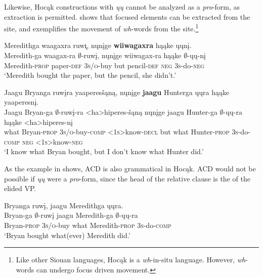 \documentclass[output=paper]{LSP/langsci}
\begin{document}
Likewise, Hocąk constructions with \emph{ųų} cannot be analyzed as a \emph{pro}-form, as  extraction is permitted.  shows that focused elements can be extracted from the  site, and  exemplifies the movement of \emph{wh}-words from the  site.\footnote{Like other Siouan languages, Hocąk is a \emph{wh}-in-situ language. However, \emph{wh}-words can undergo focus driven movement.}
 
\ea
\ea\label{ex:johnson:47a} 
\glll Meredithga waagaxra ruw\k{\i}, nųnįge \textbf{wiiwagaxra} hąąke ųųnį.\\
Meredith-ga waagax-ra $\emptyset$-ruwį, nųnįge wiiwagax-ra hąąke $\emptyset$-ųų-nį\\
Meredith-\textsc{prop} paper-\textsc{def} \textsc{3s/o}-buy but pencil-\textsc{def} \textsc{neg} \textsc{3s}-do-\textsc{neg}\\
\trans `Meredith bought the paper, but the pencil, she didn't.'
 
\ex\label{ex:johnson:47b} 
\glll Jaagu Bryanga ruwįra yaaperesšąną, nųnįge \textbf{jaagu} Hunterga ųųra hąąke yaaperesnį.\\
Jaagu Bryan-ga $\emptyset$-ruwį-ra <ha>hiperes-šąną nųnįge jaagu Hunter-ga $\emptyset$-ųų-ra hąąke <ha>hiperes-nį\\
what Bryan-\textsc{prop} \textsc{3s/o}-buy-\textsc{comp} <\textsc{1s}>know-\textsc{decl} but what Hunter-\textsc{prop} \textsc{3s}-do-\textsc{comp} \textsc{neg} <\textsc{1s}>know-\textsc{neg}\\
\trans `I know what Bryan bought, but I don't know what Hunter did.'
\z
\z

 
As the example in  shows, ACD is also grammatical in Hocąk. ACD would not be possible if \emph{ųų} were a \emph{pro}-form, since the head of the relative clause is the  of the elided VP.
 
 
\ea\label{ex:johnson:48} 
\glll Bryanga ruwį, jaagu Meredithga ųųra.\\
Bryan-ga $\emptyset$-ruwį jaagu Meredith-ga $\emptyset$-ųų-ra\\
Bryan-\textsc{prop} \textsc{3s/o}-buy what Meredith-\textsc{prop} \textsc{3s}-do-\textsc{comp}\\
\trans `Bryan bought what(ever) Meredith did.'
\z
\end{document}
